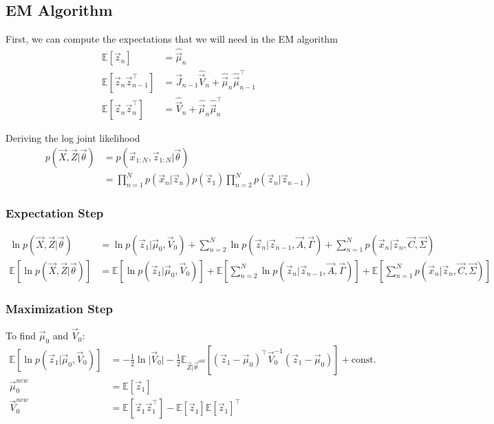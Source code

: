 \documentclass[12pt,twoside]{article}
\begin{document}
\subsection{EM Algorithm}
First, we can compute the expectations that we will need in the EM algorithm
\begin{align*}
	\mathbb{E} [\vec{z}_n] 								& = 	\hat{\vec{\mu}}_n\\
	\mathbb{E} [\vec{z}_n \vec{z}_{n-1}^\top]	& = \vec{J}_{n-1}\hat{\vec{V}}_n + \hat{\vec{\mu}}_n\hat{\vec{\mu}}_{n-1}^\top\\
	\mathbb{E} [\vec{z}_n\vec{z}_n^\top]			& = \hat{\vec{V}}_n + \hat{\vec{\mu}}_n \hat{\vec{\mu}}_n ^\top
\end{align*}

Deriving the log joint likelihood
\begin{align*}
	p(\vec{X}, \vec{Z}\vert \vec{\theta}) 
	& = p(\vec{x}_{1:N},\vec{z}_{1:N}\vert \vec{\theta} )\\
	& = \prod_{n=1}^N p(\vec{x}_n \vert \vec{z}_n) p(\vec{z}_1) \prod_{n=2}^N p(\vec{z}_n \vert \vec{z}_{n-1})
\end{align*}

\subsubsection{Expectation Step}
\begin{align*}
	\ln p(\vec{X}, \vec{Z}\vert \vec{\theta}) 
	& = \ln p(\vec{z}_1\vert \vec{\mu}_0, \vec{V}_0) + \sum_{n=2}^N \ln p(\vec{z}_n \vert \vec{z}_{n-1}, \vec{A}, \vec{\Gamma}) + \sum_{n=1}^N p(\vec{x}_n \vert \vec{z}_n, \vec{C}, \vec{\Sigma}) \\
	\mathbb{E}[	\ln p(\vec{X}, \vec{Z}\vert \vec{\theta}) ]
	& = \mathbb{E}[\ln p(\vec{z}_1\vert \vec{\mu}_0, \vec{V}_0)] + \mathbb{E}\left[\sum_{n=2}^N \ln p(\vec{z}_n \vert \vec{z}_{n-1}, \vec{A}, \vec{\Gamma})\right] + \mathbb{E}\left[\sum_{n=1}^N p(\vec{x}_n \vert \vec{z}_n, \vec{C}, \vec{\Sigma}) \right]
\end{align*}

\subsubsection{Maximization Step}
To find $\vec{\mu}_0$ and $\vec{V}_0$:
\begin{align*}
	\mathbb{E}[\ln p(\vec{z}_1\vert \vec{\mu}_0, \vec{V}_0)] 
	&= -\frac{1}{2}\ln \vert \vec{V}_0\vert -\frac{1}{2}\mathbb{E}_{\vec{Z}\vert \vec{\theta}^{old}}\left[(\vec{z}_1-\vec{\mu}_0)^\top\vec{V}_0^{-1} (\vec{z}_1-\vec{\mu}_0)\right] + \text{const.}\\
	\vec{\mu}_0^{new}	&= \mathbb{E}[\vec{z}_1]\\
	\vec{V}_0^{new}		&= \mathbb{E}[\vec{z}_1\vec{z}_1^\top] - \mathbb{E}[\vec{z}_1]\mathbb{E}[\vec{z}_1]^\top
\end{align*}
\end{document}
